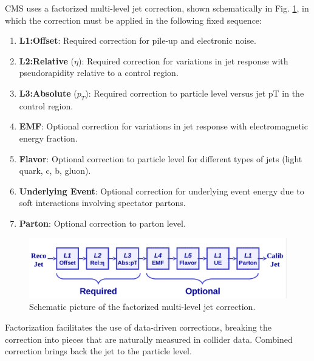 CMS uses a factorized multi-level jet correction, shown schematically in Fig. \ref{jet3figure}, in
which the correction must be applied in the following fixed sequence:
\begin{enumerate}
\item 
\textbf{L1:Offset}: Required correction for pile-up and electronic noise.
\item
\textbf{L2:Relative} ($\eta$): Required correction for variations in jet response with pseudorapidity relative to a control region.
\item
\textbf{L3:Absolute} ($p_{T}$): Required correction to particle level versus jet pT in the control region.
\item
\textbf{EMF}: Optional correction for variations in jet response with electromagnetic energy fraction.
\item
\textbf{Flavor}: Optional correction to particle level for different types of jets (light quark, c, b, gluon).
\item
\textbf{Underlying Event}: Optional correction for underlying event energy due to soft interactions involving spectator partons.
\item
\textbf{Parton}: Optional correction to parton level.
\end{enumerate}
\begin{figure}[H]
\caption{Schematic picture of the factorized multi-level jet correction. \label{jet3figure}}
  \centering
\includegraphics[width=13cm]{physics_objects_plots/jetcorr2}
\end{figure}
Factorization facilitates the use of data-driven corrections, breaking the correction into pieces that are naturally measured in collider data. Combined correction brings back the jet to the particle level.

